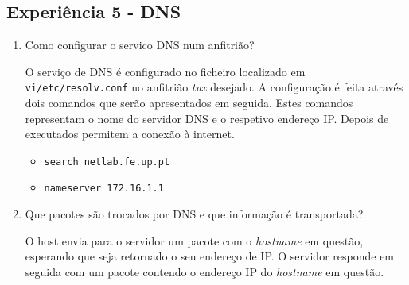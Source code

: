 \documentclass{article}
\begin{document}
\subsection{Experiência 5 - DNS}
\begin{enumerate}
\item Como configurar o servico DNS num anfitrião?

O serviço de DNS é configurado no ficheiro localizado em \texttt{vi/etc/resolv.conf} no anfitrião \textit{tux} desejado.
A configuração é feita através dois comandos que serão apresentados em seguida. Estes comandos representam o nome do servidor DNS e o respetivo endereço IP. Depois de executados permitem a conexão à internet.
\begin{itemize}
    \item \texttt{search netlab.fe.up.pt}
    \item \texttt{nameserver 172.16.1.1}
\end{itemize}

\item Que pacotes são trocados por DNS e que informação é transportada?

O host envia para o servidor um pacote com o \textit{hostname} em questão, esperando que seja retornado o seu endereço de IP.
O servidor responde em seguida com um pacote contendo o endereço IP do \textit{hostname} em questão.

\end{enumerate}
\end{document}
